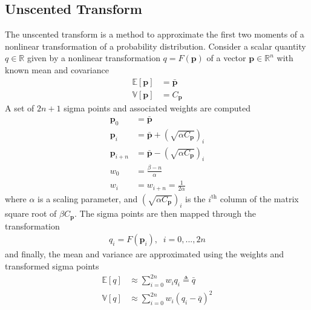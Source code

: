\documentclass[journal ]{new-aiaa}
\newcommand{\param}{\ensuremath{\mathbf{p}}}
\newcommand{\E}[1]{\mathbb{E}\left[#1\right]}
\newcommand{\V}[1]{\mathbb{V}[#1]}
\newcommand{\cov}{C}
\begin{document}
\subsection*{Unscented Transform}
The unscented transform is a method to approximate the first two moments of a nonlinear transformation of a probability distribution. Consider a scalar quantity $q\in\mathbb{R}$ given by a nonlinear transformation $q = F(\param)$ of a vector $\param\in\mathbb{R}^n$ with known mean and covariance
\begin{align*}
\E{\param} &= \bar{\param}\\
\V{\param} &= \cov_{\param}
\end{align*}
A set of $2n+1$ sigma points and associated weights are computed 
\begin{align*}
\param_0 &= \bar{\param} \\
\param_i &=  \bar{\param} + \left(\sqrt{\alpha \cov_{\param}}\right)_i \\
\param_{i+n} &=  \bar{\param} - \left(\sqrt{\alpha\cov_{\param}}\right)_i \\
w_0 &= \frac{\beta - n}{\alpha} \\
w_i &= w_{i+n} = \frac{1}{2\alpha}
\end{align*}
where $\alpha$ is a scaling parameter, and $\left(\sqrt{\alpha \cov_{\param}}\right)_i$ is the $i^{\mathrm{th}}$ column of the matrix square root of $\beta \cov_{\param}$. The sigma points are then mapped through the transformation
\begin{align}
q_i = F(\param_i),\;\;i=0,...,2n
\end{align}
and finally, the mean and variance are approximated using the weights and transformed sigma points
\begin{align*}
\E{q} &\approx \sum_{i=0}^{2n}w_iq_i  \triangleq \bar{q}\\
\V{q} &\approx \sum_{i=0}^{2n}w_i\left(q_i - \bar{q}\right)^2
\end{align*}
\end{document}
